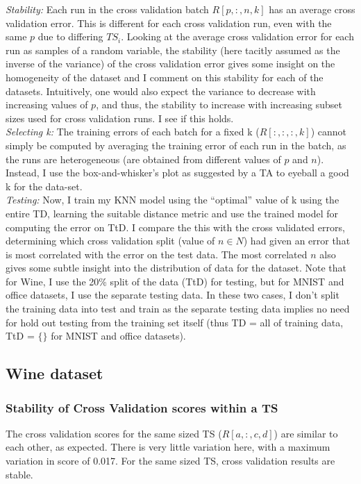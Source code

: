 \documentclass[5pt]{article}
\begin{document}
\noindent \emph{Stability:} Each run in the cross validation batch $R[p,:,n,k]$
has an average cross validation error. This is different for each cross
validation run, even with the same $p$ due to differing $TS_i$. Looking at the
average cross validation error for each run as samples of a random variable,
the stability (here tacitly assumed as the inverse of the variance) of the
cross validation error gives some insight on the homogeneity of the dataset and
I comment on this stability for each of the datasets. Intuitively, one would
also expect the variance to decrease with increasing values of $p$, and thus,
the stability to increase with increasing subset sizes used for cross
validation runs. I see if this holds.\\

\noindent \emph{Selecting k:}
The training errors of each batch for a fixed k ($R[:,:,:,k]$) cannot simply be
computed by averaging the training error of each run in the batch, as the runs
are heterogeneous (are obtained from different values of $p$ and $n$). Instead,
I use the box-and-whisker's plot as suggested by a TA to eyeball a good k for
the data-set.\\

\noindent \emph{Testing:}
Now, I train my KNN model using the ``optimal'' value of k using the
entire TD, learning the suitable distance metric and use the trained model for
computing the error on TtD. I compare the this with the cross validated errors,
determining which cross validation split (value of $n \in N$) had given an error
that is most correlated with the error on the test data. The most correlated
$n$ also gives some subtle insight into the distribution of data for the
dataset. Note that for Wine, I use the 20\% split of the data (TtD) for
testing, but for MNIST and office datasets, I use the separate testing data. In
these two cases, I don't split the training data into test and train as the
separate testing data implies no need for hold out testing from the training
set itself (thus TD = all of training data, TtD = $\{\}$ for MNIST and office
datasets).

\subsection{Wine dataset}
\subsubsection{Stability of Cross Validation scores within a TS}
The cross validation scores for the same sized TS ($R[a,:,c,d]$) are similar to
each other, as expected. There is very little variation here, with a maximum
variation in score of 0.017. For the same sized TS, cross validation results
are stable.
\end{document}
